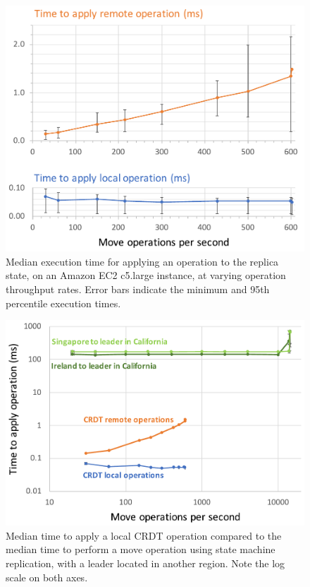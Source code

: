 \documentclass[10pt,journal,compsoc]{IEEEtran}
\begin{document}
\begin{figure}
  \includegraphics[width=\columnwidth,keepaspectratio=true]{plot.pdf}
  \caption{Median execution time for applying an operation to the replica state, on an Amazon EC2 c5.large instance, at varying operation throughput rates. Error bars indicate the minimum and 95th percentile execution times.}
  \label{fig:plots}
\end{figure}

\begin{figure}
  \includegraphics[width=\columnwidth,keepaspectratio=true]{leader-plot.pdf}
  \caption{Median time to apply a local CRDT operation compared to the median time to perform a move operation using state machine replication, with a leader located in another region. Note the log scale on both axes.}
  \label{fig:leader-plot}
\end{figure}
\end{document}
